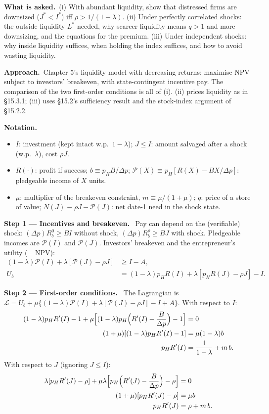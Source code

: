 \documentclass[11pt,a4paper]{article}
\newcommand{\notation}{\par\noindent\textbf{Notation.}}
\newcommand{\step}[2]{\par\medskip\noindent\textbf{Step #1 --- #2.}~}
\newcommand{\asked}{\par\medskip\noindent\textbf{What is asked.}~}
\newcommand{\approach}{\par\smallskip\noindent\textbf{Approach.}~}
\newcommand{\Pc}{\mathcal{P}}
\begin{document}
\asked (i) With abundant liquidity, show that distressed firms are downsized ($J^*<I^*$) iff $\rho>1/(1-\lambda)$. (ii) Under perfectly correlated shocks: the outside liquidity $L^*$ needed, why scarcer liquidity means $q>1$ and more downsizing, and the equations for the premium. (iii) Under independent shocks: why inside liquidity suffices, when holding the index suffices, and how to avoid wasting liquidity.

\approach Chapter 5's liquidity model with decreasing returns: maximise NPV subject to investors' breakeven, with state-contingent incentive pay. The comparison of the two first-order conditions is all of (i). (ii) prices liquidity as in \S15.3.1; (iii) uses \S15.2's sufficiency result and the stock-index argument of \S15.2.2.

\notation
\begin{itemize}
  \item $I$: investment (kept intact w.p.\ $1-\lambda$); $J\leq I$: amount salvaged after a shock (w.p.\ $\lambda$), cost $\rho J$.
  \item $R(\cdot)$: profit if success; $b\equiv p_HB/\Delta p$; $\Pc(X)\equiv p_H[R(X)-BX/\Delta p]$: pledgeable income of $X$ units.
  \item $\mu$: multiplier of the breakeven constraint, $m\equiv\mu/(1+\mu)$; $q$: price of a store of value; $N(J)\equiv\rho J-\Pc(J)$: net date-1 need in the shock state.
\end{itemize}

\step{1}{Incentives and breakeven} Pay can depend on the (verifiable) shock: $(\Delta p)R_b^0\geq BI$ without shock, $(\Delta p)R_b^\rho\geq BJ$ with shock. Pledgeable incomes are $\Pc(I)$ and $\Pc(J)$. Investors' breakeven and the entrepreneur's utility (= NPV):
\begin{align}
  (1-\lambda)\Pc(I)+\lambda[\Pc(J)-\rho J] &\geq I-A, \label{r10e12-be}\\
  U_b &= (1-\lambda)p_HR(I)+\lambda[p_HR(J)-\rho J]-I. \label{r10e12-Ub}
\end{align}

\step{2}{First-order conditions} The Lagrangian is $\mathcal L=U_b+\mu\{(1-\lambda)\Pc(I)+\lambda[\Pc(J)-\rho J]-I+A\}$. With respect to $I$:
\begin{align}
  (1-\lambda)p_HR'(I)-1+\mu\Bigl[(1-\lambda)p_H\Bigl(R'(I)-\frac{B}{\Delta p}\Bigr)-1\Bigr] &= 0 \nonumber\\
  (1+\mu)[(1-\lambda)p_HR'(I)-1] &= \mu(1-\lambda)b \nonumber\\
  p_HR'(I) &= \frac{1}{1-\lambda}+m\,b. \label{r10e12-focI}
\end{align}
With respect to $J$ (ignoring $J\leq I$):
\begin{align}
  \lambda[p_HR'(J)-\rho]+\mu\lambda\Bigl[p_H\Bigl(R'(J)-\frac{B}{\Delta p}\Bigr)-\rho\Bigr] &= 0 \nonumber\\
  (1+\mu)[p_HR'(J)-\rho] &= \mu b \nonumber\\
  p_HR'(J) &= \rho+m\,b. \label{r10e12-focJ}
\end{align}
\end{document}
